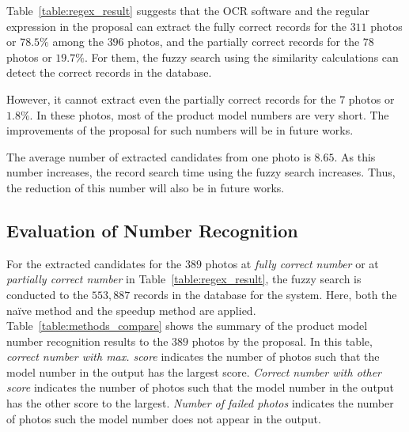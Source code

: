 \documentclass[technicalreport]{ieicej}
\begin{document}
       Table~\ref{table:regex_result} suggests that the OCR software and the regular expression in the proposal can extract the fully correct records for the $311$ photos or $78.5\%$ among the $396$ photos, and the partially correct records for the $78$ photos or $19.7\%$. For them, the fuzzy search using the similarity calculations can detect the correct records in the database.

        However, it cannot extract even the partially correct records for the $7$ photos or $1.8\%$. In these photos, most of the product model numbers are very short. The improvements of the proposal for such numbers will be in future works.
        
        The average number of extracted candidates from one photo is $8.65$. As this number increases, the record search time using the fuzzy search increases. Thus, the reduction of this number will also be in future works.


    \subsection{Evaluation of Number Recognition}
           
        For the extracted candidates for the $389$ photos at {\em fully correct number} or at {\em partially correct number} in Table~\ref{table:regex_result}, the fuzzy search is conducted to the $553,887$ records in the database for the system. Here, both the naïve method and the speedup method are applied. Table~\ref{table:methods_compare} shows the summary of the product model number recognition results to the $389$ photos by the proposal. In this table, {\em correct number with max. score} indicates the number of photos such that the model number in the output has the largest score. {\em Correct number with other score} indicates the number of photos such that the model number in the output has the other score to the largest. {\em Number of failed photos} indicates the number of photos such the model number does not appear in the output. 
\end{document}
